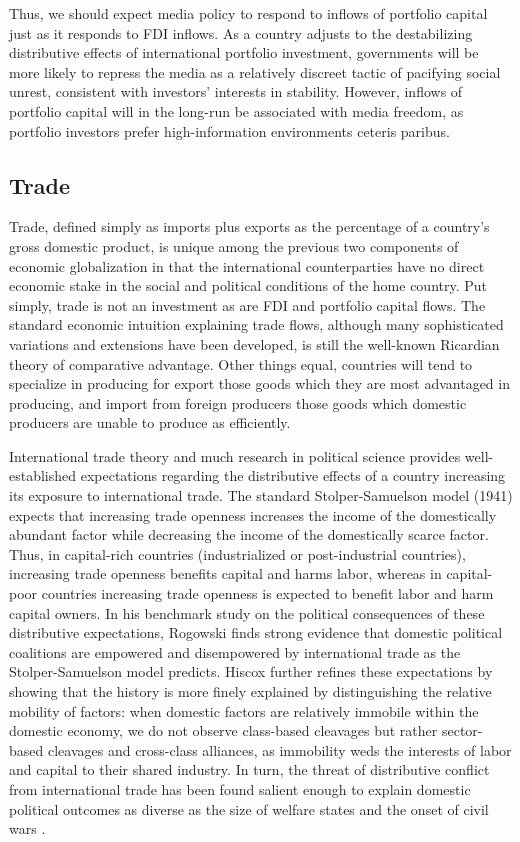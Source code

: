 \documentclass[12pt,a4paper]{article}\usepackage[]{graphicx}\usepackage[]{color}
\begin{document}
Thus, we should expect media policy to respond to inflows of portfolio capital just as it responds to FDI inflows. As a country adjusts to the destabilizing distributive effects of international portfolio investment, governments will be more likely to repress the media as a relatively discreet tactic of pacifying social unrest, consistent with investors' interests in stability. However, inflows of portfolio capital will in the long-run be associated with media freedom, as portfolio investors prefer high-information environments ceteris paribus.

\subsection{Trade}

Trade, defined simply as imports plus exports as the percentage of a country's gross domestic product, is unique among the previous two components of economic globalization in that the international counterparties have no direct economic stake in the social and political conditions of the home country. Put simply, trade is not an investment as are FDI and portfolio capital flows. The standard economic intuition explaining trade flows, although many sophisticated variations and extensions have been developed, is still the well-known Ricardian theory of comparative advantage. Other things equal, countries will tend to specialize in producing for export those goods which they are most advantaged in producing, and import from foreign producers those goods which domestic producers are unable to produce as efficiently.

International trade theory and much research in political science provides well-established expectations regarding the distributive effects of a country increasing its exposure to international trade. The standard Stolper-Samuelson model (1941) expects that increasing trade openness increases the income of the domestically abundant factor while decreasing the income of the domestically scarce factor. Thus, in capital-rich countries (industrialized or post-industrial countries), increasing trade openness benefits capital and harms labor, whereas in capital-poor countries increasing trade openness is expected to benefit labor and harm capital owners. In his benchmark study on the political consequences of these distributive expectations, Rogowski \parencite*{Rogowski:1989wm} finds strong evidence that domestic political coalitions are empowered and disempowered by international trade as the Stolper-Samuelson model predicts. Hiscox \parencite*{Hiscox:2002us} further refines these expectations by showing that the history is more finely explained by distinguishing the relative mobility of factors: when domestic factors are relatively immobile within the domestic economy, we do not observe class-based cleavages but rather sector-based cleavages and cross-class alliances, as immobility weds the interests of labor and capital to their shared industry. In turn, the threat of distributive conflict from international trade has been found salient enough to explain domestic political outcomes as diverse as the size of welfare states \parencites{Cameron:1978vb}{Burgoon:2001dp} and the onset of civil wars \parencite{Bussmann:2007vx}.
\end{document}
